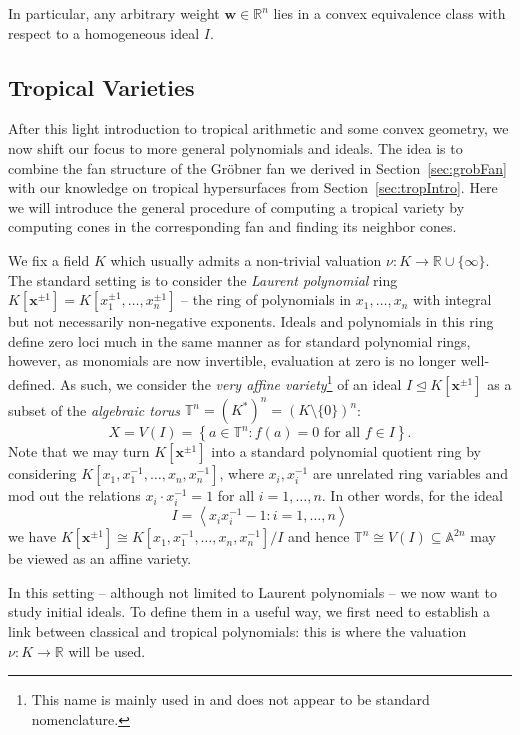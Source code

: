 \documentclass[
  paper=a4,
  titlepage,
  bibliography=totoc,
  pagesize=pdftex
]{scrartcl}
\numberwithin{figure}{section}
\numberwithin{equation}{section}
\numberwithin{table}{section}
\newcommand*\setR{\mathds{R}}
\newcommand*\setA{\mathds{A}}
\newcommand*\setT{\mathds{T}}
\newcommand*\ideal[1]{\left\langle #1 \right\rangle}
\let\vec\mathbf
\let\idealof\trianglelefteq
\theoremstyle{definition}
\numberwithin{definition}{section}
\begin{document}
In particular, any arbitrary weight $\vec w \in \setR^n$ lies in a convex equivalence
class with respect to a homogeneous ideal $I$.

\subsection{Tropical Varieties}
\label{sec:tropVar}

After this light introduction to tropical arithmetic and some convex geometry, we now
shift our focus to more general polynomials and ideals. The idea is to combine the fan
structure of the Gröbner fan we derived in Section~\ref{sec:grobFan} with our knowledge on
tropical hypersurfaces from Section~\ref{sec:tropIntro}. Here we will introduce the
general procedure of computing a tropical variety by computing cones in the corresponding
fan and finding its neighbor cones.

We fix a field $K$ which usually admits a non-trivial valuation $\nu : K \to \setR \cup
\{\infty\}$. The standard setting is to consider the \emph{Laurent polynomial} ring
$K[\vec x^{\pm1}] = K[x_1^{\pm1}, \dots, x_n^{\pm1}]$ -- the ring of polynomials in $x_1,
\dots, x_n$ with integral but not necessarily non-negative exponents. Ideals and
polynomials in this ring define zero loci much in the same manner as for standard
polynomial rings, however, as monomials are now invertible, evaluation at zero is no
longer well-defined. As such, we consider the \emph{very affine variety}\footnote{This
  name is mainly used in \cite{sturmMacTrop} and does not appear to be standard
nomenclature.} of an ideal $I \idealof K[\vec x^{\pm1}]$ as a subset of the
\emph{algebraic torus} $\setT^n = {(K^*)}^n = {(K \setminus \{0\})}^n$:
\[
  X = V(I) = \left\{ a \in \setT^n : f(a) = 0 \text{ for all $f \in I$} \right\}.
\]
Note that we may turn $K[\vec x^{\pm1}]$ into a standard polynomial quotient ring by
considering $K[x_1,x_1^{-1}, \dots, x_n,x_n^{-1}]$, where $x_i, x_i^{-1}$ are unrelated
ring variables and mod out the relations $x_i\cdot x_i^{-1} = 1$ for all $i=1,\dots,n$.
In other words, for the ideal
\[
  I = \ideal{ x_ix_i^{-1}-1 : i = 1, \dots, n}
\]
we have $K[\vec x^{\pm1}] \cong K[x_1,x_1^{-1}, \dots, x_n,x_n^{-1}]/I$ and hence $\setT^n
\cong V(I) \subseteq \setA^{2n}$ may be viewed as an affine variety.

In this setting -- although not limited to Laurent polynomials -- we now want to study
initial ideals. To define them in a useful way, we first need to establish a link between
classical and tropical polynomials: this is where the valuation $\nu:K\to\setR$ will be
used.
\end{document}
